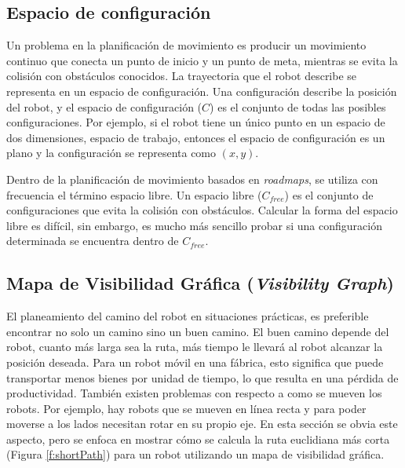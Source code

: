 \subsection{Espacio de configuraci\'on}

Un problema en la planificaci\'on de movimiento es producir un movimiento continuo que conecta un punto de inicio y un punto de meta, mientras se evita la colisi\'on con obst\'aculos conocidos. La trayectoria que el robot describe se representa en un espacio de configuraci\'on. Una configuraci\'on describe la posici\'on del robot, y el espacio de configuraci\'on ($C$) es el conjunto de todas las posibles configuraciones. Por ejemplo, si el robot tiene un \'unico punto en un espacio de dos dimensiones, espacio de trabajo, entonces el espacio de configuraci\'on es un plano y la configuraci\'on se representa como $(x,y)$.

Dentro de la planificaci\'on de movimiento basados en \textit{roadmaps}, se utiliza con frecuencia el t\'ermino espacio libre. Un espacio libre ($C_{free}$) es el conjunto de configuraciones que evita la colisi\'on con obst\'aculos. Calcular la forma del espacio libre es dif\'icil, sin embargo, es mucho m\'as sencillo probar si una configuraci\'on determinada se encuentra dentro de $C_{free}$. 

\subsection{Mapa de Visibilidad Gr\'afica (\textit{Visibility Graph})}

El planeamiento del camino del robot en situaciones pr\'acticas, es preferible encontrar no solo un camino sino un buen camino. El buen camino depende del robot, cuanto m\'as larga sea la ruta, m\'as tiempo le llevar\'a al robot alcanzar la posici\'on deseada. Para un robot m\'ovil en una f\'abrica, esto significa que puede transportar menos bienes por unidad de tiempo, lo que resulta en una p\'erdida de productividad. Tambi\'en existen problemas con respecto a como se mueven los robots. Por ejemplo, hay robots que se mueven en l\'inea recta y para poder moverse a los lados necesitan rotar en su propio eje. En esta secci\'on se obvia este aspecto, pero se enfoca en mostrar c\'omo se calcula la ruta euclidiana m\'as corta (Figura \ref{f:shortPath}) para un robot utilizando un mapa de visibilidad gr\'afica.

